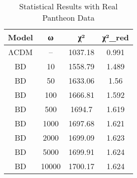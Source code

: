 \begin{table}[ht]
\centering
\caption{Statistical Results with Real Pantheon Data}
\label{tab:stats_real}
\begin{tabular}{cccc}
\toprule
Model & ω & χ² & χ²_red \\
\midrule
ΛCDM & -- & 1037.18 & 0.991 \\
BD & 10 & 1558.79 & 1.489 \\
BD & 50 & 1633.06 & 1.56 \\
BD & 100 & 1666.81 & 1.592 \\
BD & 500 & 1694.7 & 1.619 \\
BD & 1000 & 1697.68 & 1.621 \\
BD & 2000 & 1699.09 & 1.623 \\
BD & 5000 & 1699.91 & 1.624 \\
BD & 10000 & 1700.17 & 1.624 \\
\bottomrule
\end{tabular}
\end{table}
